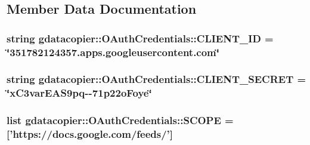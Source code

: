 \subsection{\-Member \-Data \-Documentation}
\hypertarget{classgdatacopier_1_1_o_auth_credentials_a163ae90afac416c406f84e23599c56a3}{
\subsubsection[{\-C\-L\-I\-E\-N\-T\-\_\-\-I\-D}]{\setlength{\rightskip}{0pt plus 5cm}string {\bf gdatacopier\-::\-O\-Auth\-Credentials\-::\-C\-L\-I\-E\-N\-T\-\_\-\-I\-D} = \char`\"{}351782124357.apps.\-googleusercontent.\-com\char`\"{}}}\label{classgdatacopier_1_1_o_auth_credentials_a163ae90afac416c406f84e23599c56a3}
\hypertarget{classgdatacopier_1_1_o_auth_credentials_afc547b419fa42751c59c7f14088013eb}{
\subsubsection[{\-C\-L\-I\-E\-N\-T\-\_\-\-S\-E\-C\-R\-E\-T}]{\setlength{\rightskip}{0pt plus 5cm}string {\bf gdatacopier\-::\-O\-Auth\-Credentials\-::\-C\-L\-I\-E\-N\-T\-\_\-\-S\-E\-C\-R\-E\-T} = \char`\"{}x\-C3var\-E\-A\-S9pq-\/-\/71p22o\-Foye\char`\"{}}}\label{classgdatacopier_1_1_o_auth_credentials_afc547b419fa42751c59c7f14088013eb}
\hypertarget{classgdatacopier_1_1_o_auth_credentials_a5f2ea4009689417028c750fdff048711}{
\subsubsection[{\-S\-C\-O\-P\-E}]{\setlength{\rightskip}{0pt plus 5cm}list {\bf gdatacopier\-::\-O\-Auth\-Credentials\-::\-S\-C\-O\-P\-E} = \mbox{[}'https\-://docs.\-google.\-com/feeds/'\mbox{]}}}\label{classgdatacopier_1_1_o_auth_credentials_a5f2ea4009689417028c750fdff048711}
